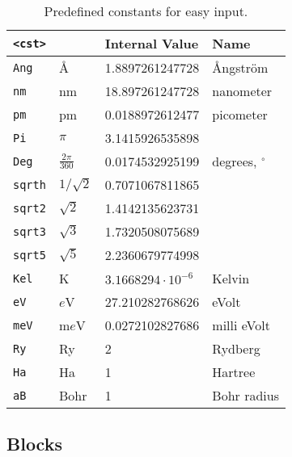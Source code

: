 \documentclass[12pt,BCOR8mm,noappendixprefix,nochapterprefix,bibtotoc,idxtotoc,openbib,tablecaptionabove]{scrbook}
\newcommand{\E}[1]{\cdot 10^{#1}}
\newcommand{\ttt}[1]{\texttt{#1}}
\begin{document}
\begin{table}
\centering
\begin{tabular}{ l lll }
\hline
 \ttt{<cst>} &    &  Internal Value &  Name  \\
\hline
 \ttt{Ang}   & \AA{}     & 1.8897261247728  & \AA{}ngstr\"om\\
 \ttt{nm}    & nm        & 18.897261247728  & nanometer     \\
 \ttt{pm}    & pm        & 0.0188972612477  & picometer     \\
 \ttt{Pi}    & $\pi$     & 3.1415926535898  &               \\
 \ttt{Deg}   & $\frac{2\pi}{360}$ & 0.0174532925199 & degrees, $^\circ$ \\
 \ttt{sqrth} & $1/\sqrt{2}$ & 0.7071067811865 &                \\
 \ttt{sqrt2} & $\sqrt 2$ & 1.4142135623731 &                \\
 \ttt{sqrt3} & $\sqrt 3$ & 1.7320508075689 &                \\
 \ttt{sqrt5} & $\sqrt 5$ & 2.2360679774998 &                \\
 \ttt{Kel}   & K         & $3.1668294\E{-6}$& Kelvin        \\
 \ttt{eV}    & $e$V      & 27.210282768626  & eVolt         \\
 \ttt{meV}   & m$e$V     & 0.0272102827686  & milli eVolt    \\
 \ttt{Ry}    & Ry        & 2                & Rydberg       \\
 \ttt{Ha}    & Ha        & 1                & Hartree       \\
 \ttt{aB}    & Bohr      & 1                & Bohr radius   \\
\hline
\end{tabular}
\caption{Predefined constants for easy input.}
\label{tab:MAN_predefined_constants}
\end{table}


\subsection{Blocks} \label{sec:MAN_blocks}
\end{document}
